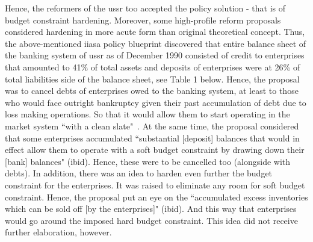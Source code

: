 Hence, the reformers of the \ac{ussr} too accepted the policy solution - that is of budget constraint hardening. Moreover, some high-profile reform proposals considered hardening in more acute form than original theoretical concept. Thus, the above-mentioned \ac{iiasa} policy blueprint discovered that entire balance sheet of the banking system of \ac{ussr} as of December 1990 consisted of credit to enterprises that amounted to 41\% of total assets and deposits of enterprises were at 26\% of total liabilities side of the balance sheet, see Table 1 below. Hence, the proposal was to cancel debts of enterprises owed to the banking system, at least to those who would face outright bankruptcy given their past accumulation of debt due to loss making operations. So that it would allow them to start operating in the market system ``with a clean slate"~\citep[p.~155]{peck1991}. At the same time, the proposal considered that some enterprises accumulated ``substantial [deposit] balances that would in effect allow them to operate with a soft budget constraint by drawing down their [bank] balances" (ibid). Hence, these were to be cancelled too (alongside with debts). In addition, there was an idea to harden even further the budget constraint for the enterprises. It was raised to eliminate any room for soft budget constraint. Hence, the proposal put an eye on the ``accumulated excess inventories which can be sold off [by the enterprises]" (ibid). And this way that enterprises would go around the imposed hard budget constraint. This idea did not receive further elaboration, however.

